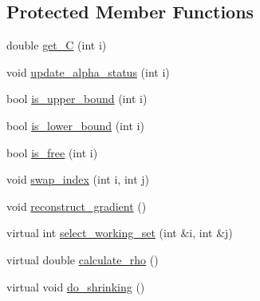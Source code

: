 \subsection*{Protected Member Functions}
\begin{DoxyCompactItemize}
\item 
double \hyperlink{classSolver_ae55a8581815436d13e760dadaec34e2a}{get\+\_\+C} (int i)
\item 
void \hyperlink{classSolver_a5a978b4ff9b60b2d75e54970fd6a2c20}{update\+\_\+alpha\+\_\+status} (int i)
\item 
bool \hyperlink{classSolver_a98d878b13d6f710fcaa0b16e657a37b6}{is\+\_\+upper\+\_\+bound} (int i)
\item 
bool \hyperlink{classSolver_a5876eedb0a6de6954f6037af0992cbed}{is\+\_\+lower\+\_\+bound} (int i)
\item 
bool \hyperlink{classSolver_a7b5e230875b8b5f06150ff0690e36b47}{is\+\_\+free} (int i)
\item 
void \hyperlink{classSolver_a043f498c1dda0122859d03f9cd07dc08}{swap\+\_\+index} (int i, int j)
\item 
void \hyperlink{classSolver_a7e34992ede606a336606ae54f6e963e6}{reconstruct\+\_\+gradient} ()
\item 
virtual int \hyperlink{classSolver_a95fb4eaf33362558e1fc768f4db019d3}{select\+\_\+working\+\_\+set} (int \&i, int \&j)
\item 
virtual double \hyperlink{classSolver_ad00b01f72232ca932cad68e58c9cde5a}{calculate\+\_\+rho} ()
\item 
virtual void \hyperlink{classSolver_ad3f6665a1ca590e56b3d51f8ddcc347c}{do\+\_\+shrinking} ()
\end{DoxyCompactItemize}

